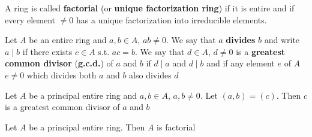 \documentclass[11pt]{article}
\begin{document}
A ring is called \textbf{factorial} (or \textbf{unique factorization ring}) if it is entire and if every
element \(\neq 0\) has a unique factorization into irreducible elements.

Let \(A\) be an entire ring and \(a,b\in A\), \(ab\neq 0\). We say that \(a\) \textbf{divides} \(b\) and
write \(a\mid b\) if there exists \(c\in A\) s.t. \(ac=b\). We say that \(d\in A\), \(d\neq 0\) is a
\textbf{greatest common divisor} (\textbf{g.c.d.}) of \(a\) and \(b\) if \(d\mid a\) and \(d\mid b\) and if any
element \(e\) of \(A\) \(e\neq 0\) which divides both \(a\) and \(b\) also divides \(d\)

\begin{proposition}[]
Let \(A\) be a principal entire ring and \(a,b\in A\), \(a,b\neq 0\). Let \((a,b)=(c)\). Then \(c\) is
a greatest common divisor of \(a\) and \(b\)
\end{proposition}

\begin{theorem}[]
Let \(A\) be a principal entire ring. Then \(A\) is factorial
\end{theorem}
\end{document}

